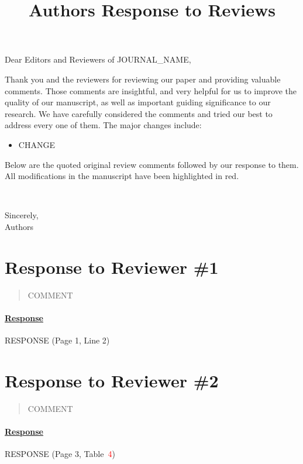 \documentclass[10pt]{article}
\title{\textbf{Authors Response to Reviews}}
\author{}
\date{\begin{flushright}\today\end{flushright}}
\providecommand{\fref}[1]{\textcolor{red}{#1}} %
\providecommand{\ftabref}[1]{Table~\fref{#1}}
\newenvironment{bgquote}
{
  \begin{tcolorbox}[
    colback=gray!10,        %
    colframe=gray!10,       %
    boxrule=0pt,            %
    arc=0pt,                %
    left=0pt,               %
    right=0pt,              %
    top=5pt,                %
    bottom=5pt              %
  ]
  \begin{quote}
}
{\end{quote}\end{tcolorbox}}
\begin{document}
\maketitle

\noindent Dear Editors and Reviewers of JOURNAL\_NAME,\newline

Thank you and the reviewers for reviewing our paper and providing valuable comments.
Those comments are insightful,
and very helpful for us to improve the quality of our manuscript,
as well as important guiding significance to our research.
We have carefully considered the comments and tried our best to address every one of them.
The major changes include:
\begin{itemize}
  \item CHANGE
\end{itemize}

Below are the quoted original review comments followed by our response to them.
All modifications in the manuscript have been highlighted in red.

~\newline

Sincerely, \\
Authors

\newpage
\section*{Response to Reviewer \#1}

\begin{bgquote}
COMMENT
\end{bgquote}

\paragraph{\underline{Response}}
RESPONSE (Page 1, Line 2)


\newpage
\section*{Response to Reviewer \#2}

\begin{bgquote}
COMMENT
\end{bgquote}

\paragraph{\underline{Response}}
RESPONSE (Page 3, \ftabref{4})
\end{document}
